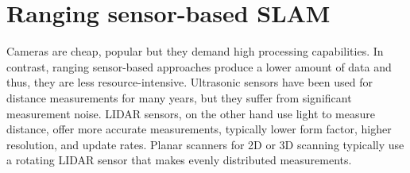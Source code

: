 \documentclass[conference]{IEEEtran}
\begin{document}
%






\section{Ranging sensor-based SLAM}
Cameras are cheap, popular but they demand high processing capabilities. In contrast, ranging sensor-based 
approaches produce a lower amount of data and thus, they are less resource-intensive. Ultrasonic sensors have been used for distance measurements for many years, but they suffer from significant 
measurement noise. LIDAR sensors, on the other hand use light to measure distance, offer more accurate 
measurements, typically lower form factor, higher resolution, and update rates. Planar scanners for 2D or 3D 
scanning typically use a rotating LIDAR sensor that makes evenly distributed measurements.
\end{document}
